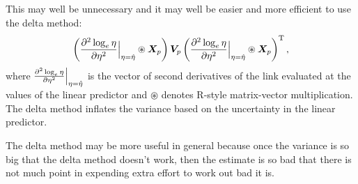 \documentclass[11pt]{amsart}
\begin{document}
This may well be unnecessary and it may well be easier and more efficient to use the delta method:
$$
\left(\frac{\partial^2 \log_e \eta}{\partial \eta^2} \Big{\vert}_{\eta=\hat{\eta}} \circledast \bm{X}_{p} \right) \bm{V}_{p} \left( \frac{\partial^2 \log_e \eta}{\partial \eta^2} \Big{\vert}_{\eta=\hat{\eta}} \circledast \bm{X}_{p} \right)^\text{T},
$$
where $\frac{\partial^2 \log_e \eta}{\partial \eta^2} \Big{\vert}_{\eta=\hat{\eta}}$ is the vector of second derivatives of the link evaluated at the values of the linear predictor and $\circledast$ denotes \textsf{R}-style matrix-vector multiplication. The delta method inflates the variance based on the uncertainty in the linear predictor.

The delta method may be more useful in general because once the variance is so big that the delta method doesn't work, then the estimate is so bad that there is not much point in expending extra effort to work out bad it is.





\end{document}
